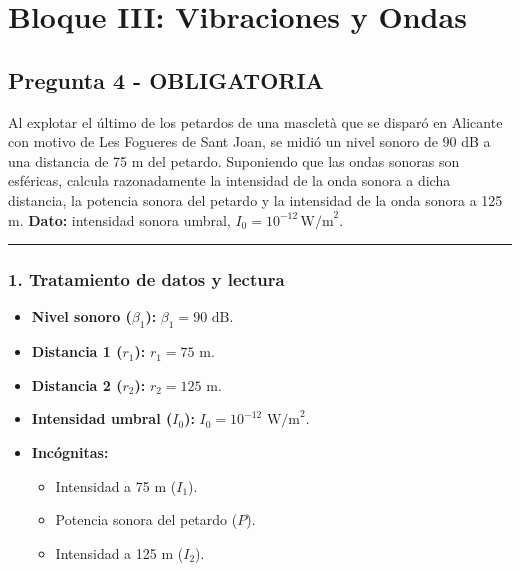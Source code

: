 \newpage

\section{Bloque III: Vibraciones y Ondas}
\label{sec:vib_ond_2025_jul_ord}

\subsection{Pregunta 4 - OBLIGATORIA}
\label{subsec:4_2025_jul_ord}

\begin{cajaenunciado}
Al explotar el último de los petardos de una mascletà que se disparó en Alicante con motivo de Les Fogueres de Sant Joan, se midió un nivel sonoro de 90 dB a una distancia de 75 m del petardo. Suponiendo que las ondas sonoras son esféricas, calcula razonadamente la intensidad de la onda sonora a dicha distancia, la potencia sonora del petardo y la intensidad de la onda sonora a 125 m.
\textbf{Dato:} intensidad sonora umbral, $I_{0}=10^{-12}\,\text{W/m}^2$.
\end{cajaenunciado}
\hrule

\subsubsection*{1. Tratamiento de datos y lectura}
\begin{itemize}
    \item \textbf{Nivel sonoro ($\beta_1$):} $\beta_1 = 90 \text{ dB}$.
    \item \textbf{Distancia 1 ($r_1$):} $r_1 = 75 \text{ m}$.
    \item \textbf{Distancia 2 ($r_2$):} $r_2 = 125 \text{ m}$.
    \item \textbf{Intensidad umbral ($I_0$):} $I_0 = 10^{-12} \text{ W/m}^2$.
    \item \textbf{Incógnitas:}
    \begin{itemize}
        \item Intensidad a 75 m ($I_1$).
        \item Potencia sonora del petardo ($P$).
        \item Intensidad a 125 m ($I_2$).
    \end{itemize}
\end{itemize}

